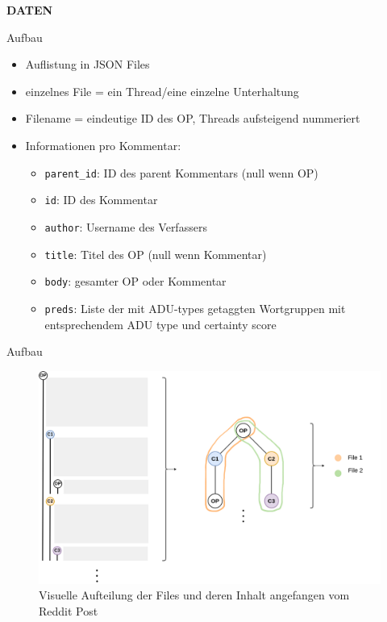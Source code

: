 \documentclass[compress,12pt]{beamer}
\begin{document}
    \End


    \begin{frame}
        \centering
        \textbf{DATEN}
    \end{frame}

    \begin{frame}{Aufbau}
        \begin{itemize}
            \item Auflistung in JSON Files
            \item einzelnes File = ein Thread/eine einzelne Unterhaltung
            \item Filename = eindeutige ID des OP, Threads aufsteigend nummeriert
            \item Informationen pro Kommentar:
            \begin{itemize}
                \item \texttt{parent\_id}: ID des parent Kommentars (null wenn OP)
                \item \texttt{id}: ID des Kommentar
                \item \texttt{author}: Username des Verfassers
                \item \texttt{title}: Titel des OP (null wenn Kommentar)
                \item \texttt{body}: gesamter OP oder Kommentar
                \item \texttt{preds}: Liste der mit ADU-types getaggten Wortgruppen mit entsprechendem ADU type und certainty score
            \end{itemize}
        \end{itemize}
    \end{frame}

    \begin{frame}{Aufbau}
        \begin{figure}
            \centering
            \includegraphics[width=\textwidth]{../images/data-files-structure}
            \caption{Visuelle Aufteilung der Files und deren Inhalt angefangen vom Reddit Post}
            \label{fig:data-structure}
        \end{figure}
    \end{frame}
\end{document}
